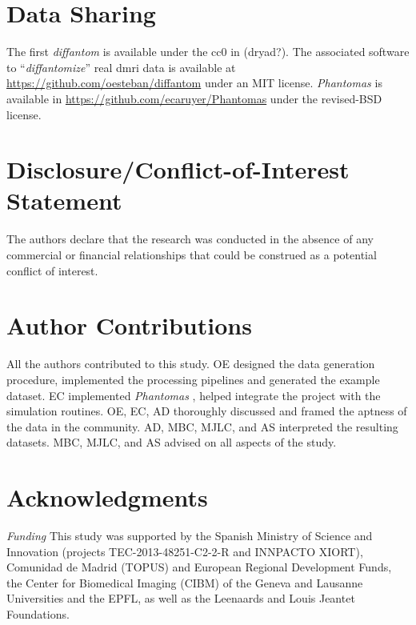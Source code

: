 \documentclass[english]{frontiers/frontiersSCNS} %
\begin{document}
\section*{Data Sharing}
The first \emph{diffantom} is available under the \gls*{cc0} in {\color{red} (dryad?)}.
The associated software to ``\emph{diffantomize}'' real \gls*{dmri} data is available at \url{https://github.com/oesteban/diffantom}
  under an MIT license.
\emph{Phantomas} is available in \url{https://github.com/ecaruyer/Phantomas} under the revised-BSD license.

\section*{Disclosure/Conflict-of-Interest Statement}

The authors declare that the research was conducted in the absence of any commercial or financial relationships that could be construed as a potential conflict of interest.

\section*{Author Contributions}
All the authors contributed to this study.
OE designed the data generation procedure, implemented the processing pipelines and generated the example dataset.
EC implemented \emph{Phantomas} \citep{caruyer_Phantomas_2014}, helped integrate the project with the simulation routines.
OE, EC, AD thoroughly discussed and framed the aptness of the data in the community.
AD, MBC, MJLC, and AS interpreted the resulting datasets.
MBC, MJLC, and AS advised on all aspects of the study.


\section*{Acknowledgments}
\textit{Funding\textcolon}
This study was supported by the Spanish Ministry of Science and Innovation
  (projects TEC-2013-48251-C2-2-R and INNPACTO XIORT), Comunidad de Madrid (TOPUS) and
  European Regional Development Funds, the Center for Biomedical Imaging
  (CIBM) of the Geneva and Lausanne Universities and the EPFL, as well as the
  Leenaards and Louis Jeantet Foundations.

\nolinenumbers



\end{document}
